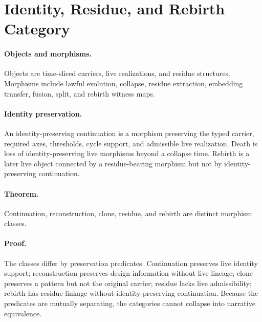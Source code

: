 
\section{Identity, Residue, and Rebirth Category}
\label{app:oc133-identity-residue-rebirth}

\paragraph{Objects and morphisms.}
Objects are time-sliced carriers, live realizations, and residue structures.
Morphisms include lawful evolution, collapse, residue extraction, embedding
transfer, fusion, split, and rebirth witness maps.

\paragraph{Identity preservation.}
An identity-preserving continuation is a morphism preserving the typed carrier,
required axes, thresholds, cycle support, and admissible live realization.
Death is loss of identity-preserving live morphisms beyond a collapse time.
Rebirth is a later live object connected by a residue-bearing morphism but not
by identity-preserving continuation.

\paragraph{Theorem.}
Continuation, reconstruction, clone, residue, and rebirth are distinct
morphism classes.

\paragraph{Proof.}
The classes differ by preservation predicates.  Continuation preserves live
identity support; reconstruction preserves design information without live
lineage; clone preserves a pattern but not the original carrier; residue lacks
live admissibility; rebirth has residue linkage without identity-preserving
continuation.  Because the predicates are mutually separating, the categories
cannot collapse into narrative equivalence.
